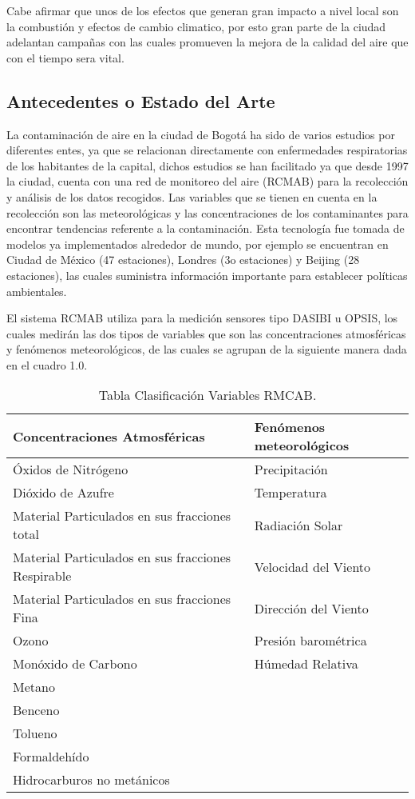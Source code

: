 \documentclass[a4paper, 11pt, oneside]{article}
\theoremstyle{definition}
\theoremstyle{remark}
\begin{document}
Cabe afirmar que unos de los efectos que generan gran impacto a nivel local son  la combustión y efectos de cambio climatico, por esto  gran parte de la ciudad adelantan campañas con las cuales promueven la mejora de la calidad del aire que con el tiempo sera vital.






\subsection{Antecedentes o Estado del Arte}
La contaminación de aire en la ciudad de Bogotá ha sido de varios estudios por diferentes entes, ya que se relacionan directamente con enfermedades respiratorias de los habitantes de la capital, dichos estudios se han facilitado ya que desde 1997 la ciudad, cuenta con una red de monitoreo del aire (RCMAB) para la recolección y análisis de los datos recogidos. Las variables que se tienen en cuenta en la recolección son las meteorológicas y las concentraciones de los contaminantes para encontrar tendencias referente a la contaminación. Esta tecnología fue tomada de modelos ya implementados alrededor de mundo, por ejemplo se encuentran en Ciudad de México  (47 estaciones), Londres (3o estaciones) y Beijing (28 estaciones), las cuales suministra información importante para establecer políticas ambientales.

El sistema RCMAB utiliza para la medición sensores tipo DASIBI u OPSIS, los cuales medirán las dos tipos de variables que son las concentraciones atmosféricas y fenómenos meteorológicos, de las cuales se agrupan de la siguiente manera dada en el cuadro 1.0.

\begin{table}[htbp]
\begin{center}
\begin{tabular}{|l|l|}
\hline
Concentraciones Atmosféricas & Fenómenos  meteorológicos \\
\hline \hline
Óxidos de Nitrógeno & Precipitación \\ \hline
Dióxido de Azufre & Temperatura \\ \hline
Material Particulados en sus fracciones total & Radiación Solar \\ \hline
Material Particulados en sus fracciones Respirable & Velocidad del Viento \\ \hline
Material Particulados en sus fracciones Fina & Dirección del Viento \\ \hline
Ozono & Presión barométrica \\ \hline
Monóxido de Carbono & Húmedad Relativa \\ \hline
Metano &  \\ \hline
Benceno &  \\ \hline
Tolueno &  \\ \hline
Formaldehído &  \\ \hline
Hidrocarburos no metánicos & \\ \hline
\end{tabular}
\caption{Tabla Clasificación Variables RMCAB.}
\label{tabla:sencilla}
\end{center}
\end{table}
\end{document}
